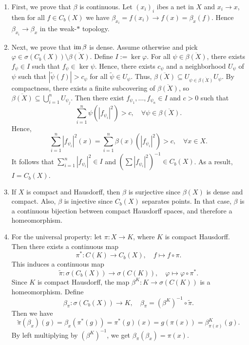 \begin{myproof}
  \begin{enumerate}
    \item First, we prove that $\beta$ is continuous. Let $(x_i)_i$ ibes a net in $X$ and $x_i \to x$,
    then for all $f \in C_b (X)$ we have $\beta_{x_i} = f(x_i) \to f(x) = \beta_x (f)$.
    Hence $\beta_{x_i} \to \beta_x$ in the weak-$*$ topology.
    \item Next, we prove that $\operatorname{im} \beta$ is dense. Assume otherwise and pick $\varphi \in \sigma(C_b (X)) \setminus \overline{\beta (X)}$.
    Define $I := \ker \varphi$. For all $\psi \in \overline{\beta (X)}$, there exists $f_{\psi} \in I$ such that $f_{\psi} \in \ker \psi$.
    Hence, there exists $c_\psi$ and a neighborhood $U_{\psi}$ of $\psi$ such that $| \widetilde{\psi} (f)| > c_{\psi}$ for all $\widetilde{\psi} \in U_{\psi}$.
    Thus, $\overline{\beta (X)} \subseteq U_{\psi \in \overline{\beta (X)}} U_{\psi}$.
    By compactness, there exists a finite subcovering of $\overline{\beta (X)}$, so $\overline{\beta (X)} \subseteq \bigcup_{i = 1} ^n U_{\psi_j}$.
    Then there exist $f_{\psi_1}, \dots, f_{\psi_n} \in I$ and $c > 0$ such that 
    $$\sum_{i = 1} ^n \psi (|f_{\psi_i}|^2) > c,\quad \forall \psi \in \overline{\beta (X)}.$$
    Hence, $$\sum_{i = 1} ^n |f_{\psi_i}|^2 (x) = \sum_{i = 1} ^n \beta (x) (|f_{\psi_i}|^2) > c,\quad \forall x \in X.$$
    It follows that $\sum_{i = 1} ^n |f_{\psi_i} |^2 \in I$ and $(\sum |f_{\psi_i}|^2)^{-1} \in C_b (X)$. As a result, $I = C_b (X)$.
    \item If $X$ is compact and Hausdorff, then $\beta$ is surjective since $\beta (X)$ is dense and compact.
    Also, $\beta$ is injective since $C_b (X)$ separates points. In that case, $\beta$ is a continuous bijection between compact Hausdorff spaces, and therefore a homeomorphism.
    \item For the universal property: let $\pi: X \to K$, where $K$ is compact Hausdorff.
    Then there exists a continuous map $$\pi^*: C(K) \rightarrow C_b (X),\quad f \mapsto f \circ \pi.$$
    This induces a continuous map 
    $$\widetilde{\pi}: \sigma(C_b (X)) \to \sigma (C(K)),\quad \varphi \mapsto \varphi \circ \pi^*.$$
    Since $K$ is compact Hausdorff, the map $\beta^K : K \to \sigma(C(K))$ is a homeomorphism.
    Define $$\beta_\pi: \sigma(C_b (X)) \to K,\quad \beta_{\pi} = (\beta^K)^{-1} \circ \widetilde{\pi}.$$
    Then we have 
    $$\widetilde{\pi} (\beta_x) (g) = \beta_x (\pi^* (g)) = \pi^* (g) (x) = g(\pi(x)) = \beta_{\pi(x)} ^K (g).$$
    By left multiplying by $(\beta^K)^{-1}$, we get $\beta_{\pi} (\beta_x) = \pi (x)$. \qedhere
  \end{enumerate}
\end{myproof}

